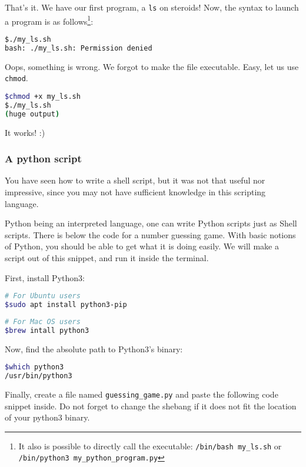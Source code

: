 \documentclass[12pt]{article}
\begin{document}
That's it. We have our first program, a \texttt{ls} on steroids! Now, the syntax to launch a program is as follows\footnote{It also is possible to directly call the executable: \texttt{/bin/bash my\_ls.sh} or \texttt{/bin/python3 my\_python\_program.py}}:

\begin{lstlisting}[language=bash]
$./my_ls.sh
bash: ./my_ls.sh: Permission denied
\end{lstlisting}

Oops, something is wrong. We forgot to make the file executable. Easy, let us use \texttt{chmod}.

\begin{lstlisting}[language=bash]
$chmod +x my_ls.sh 
$./my_ls.sh
(huge output)
\end{lstlisting}

It works! :)

\subsubsection{A python script}

You have seen how to write a shell script, but it was not that useful nor impressive, since you may not have sufficient knowledge in this scripting language.

Python being an interpreted language, one can write Python scripts just as Shell scripts. There is below the code for a number guessing game. With basic notions of Python, you should be able to get what it is doing easily. We will make a script out of this snippet, and run it inside the terminal.

First, install Python3:

\begin{lstlisting}[language=bash]
# For Ubuntu users
$sudo apt install python3-pip
\end{lstlisting}

\begin{lstlisting}[language=bash]
# For Mac OS users
$brew intall python3
\end{lstlisting}

Now, find the absolute path to Python3's binary:

\begin{lstlisting}[language=bash]
$which python3
/usr/bin/python3
\end{lstlisting}

Finally, create a file named \texttt{guessing\_game.py} and paste the following code snippet inside. Do not forget to change the shebang if it does not fit the location of your python3 binary.
\end{document}

